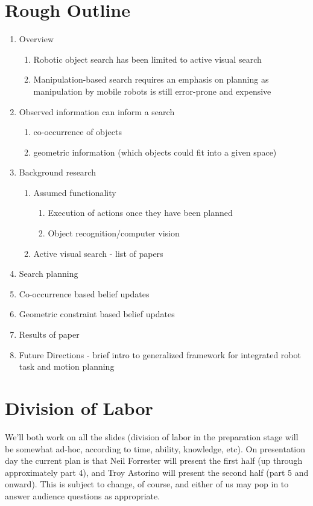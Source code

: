 \documentclass{article}
\begin{document}
\section{Rough Outline}
\begin{enumerate}
\item Overview
\begin{enumerate}
\item Robotic object search has been limited to active visual search
\item Manipulation-based search requires an emphasis on planning as manipulation by
mobile robots is still error-prone and expensive
\end{enumerate}
\item Observed information can inform a search
\begin{enumerate}
\item co-occurrence of objects
\item geometric information (which objects could fit into a given space)
\end{enumerate}
\item Background research
\begin{enumerate}
\item Assumed functionality 
\begin{enumerate}
\item Execution of actions once they have been planned
\item Object recognition/computer vision
\end{enumerate}
\item Active visual search - list of papers
\end{enumerate}
\item Search planning
\item Co-occurrence based belief updates
\item Geometric constraint based belief updates
\item Results of paper
\item Future Directions - brief intro to generalized framework for integrated robot task and
motion planning
\end{enumerate}

\section{Division of Labor}
We’ll both work on all the slides (division of labor in the preparation stage
will be somewhat ad-hoc, according to time, ability, knowledge, etc). On
presentation day the current plan is that Neil Forrester will present the first
half (up through approximately part 4), and Troy Astorino will present the
second half (part 5 and onward). This is subject to change, of course, and
either of us may pop in to answer audience questions as appropriate.
\end{document}
